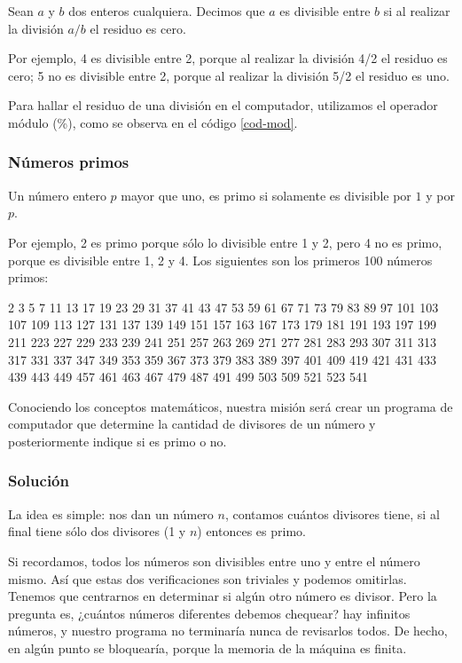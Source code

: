 Sean $a$ y $b$ dos enteros cualquiera. Decimos que $a$ es divisible entre $b$ si al realizar la división $a/b$ el residuo es cero.

Por ejemplo, 4 es divisible entre 2, porque al realizar la división 4/2 el residuo es cero; 5 no es divisible entre 2, porque al realizar la división 5/2 el residuo es uno.

Para hallar el residuo de una división en el computador, utilizamos el operador módulo (\%), como se observa en el código \ref{cod-mod}. \\





\subsubsection{Números primos}

Un número entero $p$ mayor que uno, es  primo si solamente es divisible por $1$ y por $p$.  

Por ejemplo, 2 es primo porque sólo lo divisible entre 1 y 2, pero 4 no es primo, porque es divisible entre 1, 2 y 4. Los siguientes son los primeros 100 números primos:

2 3 5 7 11 13 17 19 23 29 31 37 41 43 47 53 59 61 67 71 73 79 83 89 97 101 103 107 109 113 127 131 137 139 149 151 157 163 167 173 179 181 191 193 197 199 211 223 227 229 233 239 241 251 257 263 269 271 277 281 283 293 307 311 313 317 331 337 347 349 353 359 367 373 379 383 389 397 401 409 419 421 431 433 439 443 449 457 461 463 467 479 487 491 499 503 509 521 523 541 

Conociendo los conceptos matemáticos, nuestra misión será crear un programa de computador que determine la cantidad de divisores de un número y posteriormente indique si es primo o no.

\subsubsection{Solución}

La idea es simple: nos dan un número $n$, contamos cuántos divisores tiene, si al final tiene sólo dos divisores (1 y $n$) entonces es primo.

Si recordamos, todos los números son divisibles entre uno y entre el número mismo. Así que estas dos verificaciones son triviales y podemos omitirlas. Tenemos que centrarnos en determinar si algún otro número es divisor. Pero la pregunta es, ¿cuántos números diferentes debemos chequear? hay infinitos números, y nuestro programa no terminaría nunca de revisarlos todos. De hecho, en algún punto se bloquearía, porque la memoria de la máquina es finita. 

